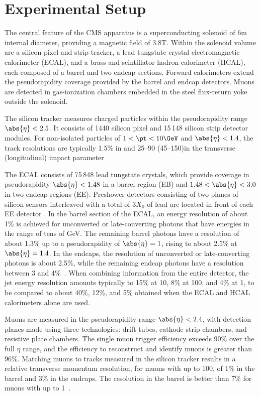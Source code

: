 
\chapter{Experimental Setup}

The central feature of the CMS apparatus is a superconducting solenoid of 6\unit{m} internal diameter, providing a magnetic field of 3.8\unit{T}. Within the solenoid volume are a silicon pixel and strip tracker, a lead tungstate crystal electromagnetic calorimeter (ECAL), and a brass and scintillator hadron calorimeter (HCAL), each composed of a barrel and two endcap sections. Forward calorimeters extend the pseudorapidity coverage provided by the barrel and endcap detectors. Muons are detected in gas-ionization chambers embedded in the steel flux-return yoke outside the solenoid. 

The silicon tracker measures charged particles within the pseudorapidity range $\abs{\eta} < 2.5$. It consists of 1440 silicon pixel and 15\,148 silicon strip detector modules. For non-isolated particles of $1 < \pt < 10\GeV$ and $\abs{\eta} < 1.4$, the track resolutions are typically 1.5\% in \pt and 25--90 (45--150)\mum in the transverse (longitudinal) impact parameter \cite{TRK-11-001} 

The ECAL consists of 75\,848 lead tungstate crystals, which provide coverage in pseudorapidity $\abs{\eta} < 1.48 $ in a barrel region (EB) and $1.48 < \abs{\eta} < 3.0$ in two endcap regions (EE). Preshower detectors consisting of two planes of silicon sensors interleaved with a total of $3 X_0$ of lead are located in front of each EE detector \cite{Khachatryan:2015hwa}. In the barrel section of the ECAL, an energy resolution of about 1\% is achieved for unconverted or late-converting photons that have energies in the range of tens of GeV. The remaining barrel photons have a resolution of about 1.3\% up to a pseudorapidity of $\abs{\eta} = 1$, rising to about 2.5\% at $\abs{\eta} = 1.4$. In the endcaps, the resolution of unconverted or late-converting photons is about 2.5\%, while the remaining endcap photons have a resolution between 3 and 4\%~\cite{CMS:EGM-14-001}. When combining information from the entire detector, the jet energy resolution amounts typically to 15\% at 10\GeV, 8\% at 100\GeV, and 4\% at 1\TeV, to be compared to about 40\%, 12\%, and 5\% obtained when the ECAL and HCAL calorimeters alone are used. 

Muons are measured in the pseudorapidity range $\abs{\eta} < 2.4$, with detection planes made using three technologies: drift tubes, cathode strip chambers, and resistive plate chambers. The single muon trigger efficiency exceeds 90\% over the full $\eta$ range, and the efficiency to reconstruct and identify muons is greater than 96\%. Matching muons to tracks measured in the silicon tracker results in a relative transverse momentum resolution, for muons with \pt up to 100\GeV, of 1\% in the barrel and 3\% in the endcaps. The \pt resolution in the barrel is better than 7\% for muons with \pt up to 1\TeV~\cite{Sirunyan:2018}. 

